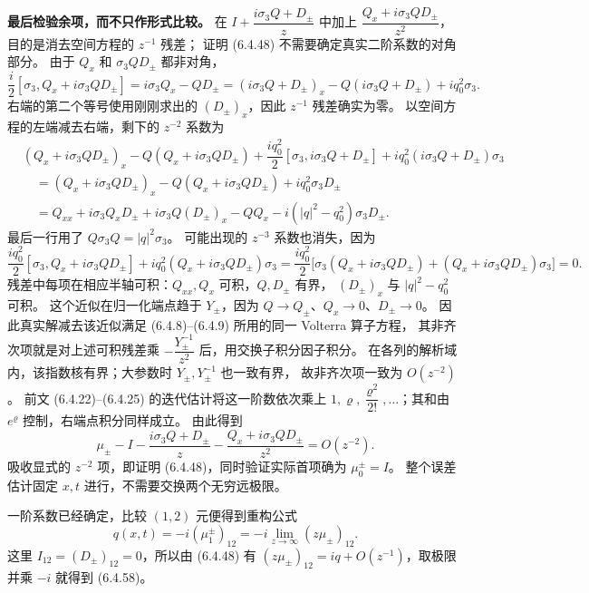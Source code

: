 \documentclass[lang=cn,scheme=chinese,mode=simple,device=normal,color=blue,
math=cm,thmcnt=section,12pt]{elegantbook}
\newcommand{\eqq}[2]{\tag{#1}\label{eq:#1}#2}
\begin{document}
\begin{callout}
    \textbf{最后检验余项，而不只作形式比较。}
    在 $I+\dfrac{i\sigma_3Q+D_\pm}{z}$ 中加上
    $\dfrac{Q_x+i\sigma_3QD_\pm}{z^2}$，目的是消去空间方程的 $z^{-1}$ 残差；
    证明 (6.4.48) 不需要确定真实二阶系数的对角部分。
    由于 $Q_x$ 和 $\sigma_3QD_\pm$ 都非对角，
    \[
        \dfrac{i}{2}[\sigma_3,Q_x+i\sigma_3QD_\pm]
        =i\sigma_3Q_x-QD_\pm
        =(i\sigma_3Q+D_\pm)_x-Q(i\sigma_3Q+D_\pm)+iq_0^2\sigma_3.
    \]
    右端的第二个等号使用刚刚求出的 $(D_\pm)_x$，因此 $z^{-1}$ 残差确实为零。
    以空间方程的左端减去右端，剩下的 $z^{-2}$ 系数为
    \[
        \begin{aligned}
             & (Q_x+i\sigma_3QD_\pm)_x-Q(Q_x+i\sigma_3QD_\pm)
            +\dfrac{iq_0^2}{2}[\sigma_3,i\sigma_3Q+D_\pm]
            +iq_0^2(i\sigma_3Q+D_\pm)\sigma_3                                           \\
             & \quad=(Q_x+i\sigma_3QD_\pm)_x-Q(Q_x+i\sigma_3QD_\pm)+iq_0^2\sigma_3D_\pm \\
             & \quad=Q_{xx}+i\sigma_3Q_xD_\pm+i\sigma_3Q(D_\pm)_x-QQ_x
            -i(|q|^2-q_0^2)\sigma_3D_\pm.
        \end{aligned}
    \]
    最后一行用了 $Q\sigma_3Q=|q|^2\sigma_3$。
    可能出现的 $z^{-3}$ 系数也消失，因为
    \[
        \dfrac{iq_0^2}{2}[\sigma_3,Q_x+i\sigma_3QD_\pm]
        +iq_0^2(Q_x+i\sigma_3QD_\pm)\sigma_3
        =\dfrac{iq_0^2}{2}\bigl[\sigma_3(Q_x+i\sigma_3QD_\pm)
            +(Q_x+i\sigma_3QD_\pm)\sigma_3\bigr]=0.
    \]
    残差中每项在相应半轴可积：$Q_{xx},Q_x$ 可积，$Q,D_\pm$ 有界，
    $(D_\pm)_x$ 与 $|q|^2-q_0^2$ 可积。
    这个近似在归一化端点趋于 $Y_\pm$，因为 $Q\to Q_\pm$、$Q_x\to0$、$D_\pm\to0$。
    因此真实解减去该近似满足 (6.4.8)--(6.4.9) 所用的同一 Volterra 算子方程，
    其非齐次项就是对上述可积残差乘 $-\dfrac{Y_\pm^{-1}}{z^2}$ 后，用交换子积分因子积分。
    在各列的解析域内，该指数核有界；大参数时 $Y_\pm,Y_\pm^{-1}$ 也一致有界，
    故非齐次项一致为 $O(z^{-2})$。
    前文 (6.4.22)--(6.4.25) 的迭代估计将这一阶数依次乘上
    $1,\varrho,\dfrac{\varrho^2}{2!},\ldots$；其和由 $e^{\varrho}$ 控制，右端点积分同样成立。
    由此得到
    \[
        \mu_\pm-I-\dfrac{i\sigma_3Q+D_\pm}{z}
        -\dfrac{Q_x+i\sigma_3QD_\pm}{z^2}=O(z^{-2}).
    \]
    吸收显式的 $z^{-2}$ 项，即证明 (6.4.48)，同时验证实际首项确为 $\mu_0^\pm=I$。
    整个误差估计固定 $x,t$ 进行，不需要交换两个无穷远极限。
\end{callout}

一阶系数已经确定，比较 $(1,2)$ 元便得到重构公式
\begin{equation}\eqq{6.4.58}{q(x,t)=-i(\mu_1^\pm)_{12}
        =-i\lim\limits_{z\to\infty}(z\mu_\pm)_{12}.}\end{equation}
这里 $I_{12}=(D_\pm)_{12}=0$，所以由 (6.4.48) 有
$(z\mu_\pm)_{12}=iq+O(z^{-1})$，取极限并乘 $-i$ 就得到 (6.4.58)。
\end{document}
